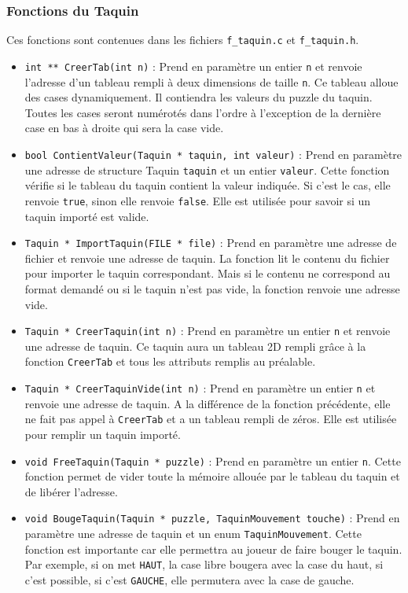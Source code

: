 \documentclass[11pt]{article}
\begin{document}
\subsubsection{Fonctions du Taquin}
\label{sec:org4091304}

Ces fonctions sont contenues dans les fichiers \texttt{f\_taquin.c} et \texttt{f\_taquin.h}.

\begin{itemize}
\item \texttt{int ** CreerTab(int n)} : Prend en paramètre un entier \texttt{n} et renvoie l'adresse d'un tableau rempli à deux dimensions de taille \texttt{n}. Ce tableau alloue des cases dynamiquement. Il contiendra les valeurs du puzzle du taquin. Toutes les cases seront numérotés dans l'ordre à l'exception de la dernière case en bas à droite qui sera la case vide.
\item \texttt{bool ContientValeur(Taquin * taquin, int valeur)} : Prend en paramètre une adresse de structure Taquin \texttt{taquin} et un entier \texttt{valeur}. Cette fonction vérifie si le tableau du taquin contient la valeur indiquée. Si c'est le cas, elle renvoie \texttt{true}, sinon elle renvoie \texttt{false}. Elle est utilisée pour savoir si un taquin importé est valide.
\item \texttt{Taquin * ImportTaquin(FILE * file)} : Prend en paramètre une adresse de fichier et renvoie une adresse de taquin. La fonction lit le contenu du fichier pour importer le taquin correspondant. Mais si le contenu ne correspond au format demandé ou si le taquin n'est pas vide, la fonction renvoie une adresse vide.
\item \texttt{Taquin * CreerTaquin(int n)} : Prend en paramètre un entier \texttt{n} et renvoie une adresse de taquin. Ce taquin aura un tableau 2D rempli grâce à la fonction \texttt{CreerTab} et tous les attributs remplis au préalable.
\item \texttt{Taquin * CreerTaquinVide(int n)} : Prend en paramètre un entier \texttt{n} et renvoie une adresse de taquin. A la différence de la fonction précédente, elle ne fait pas appel à \texttt{CreerTab} et a un tableau rempli de zéros. Elle est utilisée pour remplir un taquin importé.
\item \texttt{void FreeTaquin(Taquin * puzzle)} : Prend en paramètre un entier \texttt{n}. Cette fonction permet de vider toute la mémoire allouée par le tableau du taquin et de libérer l'adresse.
\item \texttt{void BougeTaquin(Taquin * puzzle, TaquinMouvement touche)} : Prend en paramètre une adresse de taquin et un enum \texttt{TaquinMouvement}. Cette fonction est importante car elle permettra au joueur de faire bouger le taquin. Par exemple, si on met \texttt{HAUT}, la case libre bougera avec la case du haut, si c'est possible, si c'est \texttt{GAUCHE}, elle permutera avec la case de gauche.

\end{itemize}
\end{document}
